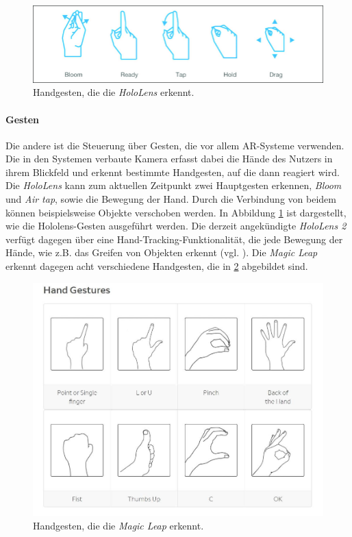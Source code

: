 \begin{figure}[!htb]
	\centering
	\includegraphics[width=0.7\linewidth]{images/hololensGestures.png}
	\caption{Handgesten, die die \textit{HoloLens} erkennt.}
	\label{img:hololensGestures}
\end{figure}
\FloatBarrier

\paragraph{Gesten}
Die andere ist die Steuerung über Gesten, die vor allem AR-Systeme verwenden.
Die in den Systemen verbaute Kamera erfasst dabei die Hände des Nutzers in ihrem Blickfeld und erkennt bestimmte Handgesten, auf die dann reagiert wird. 
Die \textit{HoloLens} kann zum aktuellen Zeitpunkt zwei Hauptgesten erkennen, \textit{Bloom} und \textit{Air tap}, sowie die Bewegung der Hand. Durch die Verbindung von beidem können beispielsweise Objekte verschoben werden. In Abbildung \ref{img:hololensGestures} ist dargestellt, wie die Hololens-Gesten ausgeführt werden. 
Die derzeit angekündigte \textit{HoloLens 2} verfügt dagegen über eine Hand-Tracking-Funktionalität, die jede Bewegung der Hände, wie z.B. das Greifen von Objekten erkennt (vgl. \cite{hololens2}). 
Die \textit{Magic Leap} erkennt dagegen acht verschiedene Handgesten, die in \ref{img:magicGestures} abgebildet sind. 

\begin{figure}[!htb]
	\centering
	\includegraphics[width=0.7\linewidth]{images/magicleapGestures.jpg}
	\caption{Handgesten, die die \textit{Magic Leap} erkennt.}
	\label{img:magicGestures}
\end{figure}
\FloatBarrier

